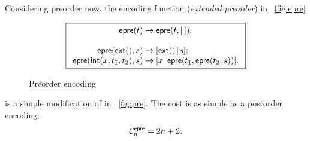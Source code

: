 Considering preorder now, the encoding function
(\emph{extended preorder}) in \fig~\vref{fig:epre}
\begin{figure}
\begin{equation*}
\boxed{
\begin{array}{r@{\;}c@{\;}l}
\fun{epre}(t) & \rightarrow & \fun{epre}(t,\el).\\
\\
\fun{epre}(\fun{ext}(),s) & \rightarrow
  & \cons{\fun{ext}()}{s};\\
\fun{epre}(\fun{int}(x,t_1,t_2),s) & \rightarrow
  & \cons{x}{\fun{epre}(t_1,\fun{epre}(t_2,s))}.
\end{array}}
\end{equation*}
\caption{Preorder encoding}
\label{fig:epre}
\end{figure}
is a simple modification of  in
\fig~\vref{fig:pre}. The cost is as simple as a postorder encoding:
\begin{equation*}
  \C{\fun{epre}}{n} = 2 n + 2.
  \index{epre@$\C{\fun{epre}}{n}$}
\end{equation*}

